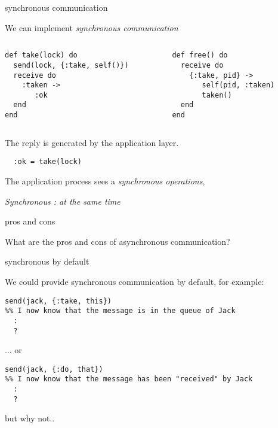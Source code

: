 \begin{frame}[fragile]{synchronous communication}

We can implement {\em synchronous communication}
\pause\vspace{5pt}

\begin{columns}
 \begin{column}{0.5\linewidth}
  \begin{verbatim}
def take(lock) do
  send(lock, {:take, self()})
  receive do
    :taken ->
       :ok
  end 
end
  \end{verbatim}
  \pause
 \end{column}
 \begin{column}{0.5\linewidth}
  \begin{verbatim}
def free() do
  receive do
    {:take, pid} ->
       self(pid, :taken)
       taken()
  end
end
  \end{verbatim}
 \end{column}
\end{columns}
\pause\vspace{10pt}
        
The reply is generated by the application layer.
\pause\vspace{5pt}

\begin{verbatim}
  :ok = take(lock)
\end{verbatim}

The application process sees a {\em synchronous operations},
\pause\vspace{5pt}

{\em Synchronous : at the same time}
\end{frame}

\begin{frame}{pros and cons}

What are the pros and cons of asynchronous communication?

\end{frame}

\begin{frame}[fragile]{synchronous by default}

We could provide synchronous communication by default, for example:
\pause\vspace{10pt}
\begin{verbatim}
send(jack, {:take, this})
%% I now know that the message is in the queue of Jack
  :
  ?
\end{verbatim}

\pause 
\vspace{10pt}... or\vspace{10pt}
\begin{verbatim}
send(jack, {:do, that})
%% I now know that the message has been "received" by Jack
  :
  ?
\end{verbatim}
\pause 
\vspace{10pt}but why not..\vspace{10pt}
\end{frame}

